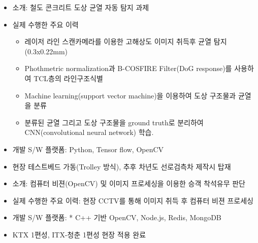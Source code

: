 \documentclass[10pt,a4paper,ragged2e]{altacv}
\begin{document}
\begin{fullwidth}
\begin{itemize}
\item 소개: 철도 콘크리트 도상 균열 자동 탐지 과제
\item 실제 수행한 주요 이력
  \begin{itemize}
    \item 레이저 라인 스캔카메라를 이용한 고해상도 이미지 취득후 균열 탐지 (0.3x0.22mm)
    \item Phothmetric normalization과 B-COSFIRE Filter(DoG response)를 사용하여 TCL층의 라인구조식별
    \item Machine learning(support vector machine)을 이용하여 도상 구조물과 균열을 분류
    \item 분류된 균열 그리고 도상 구조물을 ground truth로 분리하여 CNN(convolutional neural network) 학습.
  \end{itemize}
\item 개발 S/W 플랫폼: Python, Tensor flow, OpenCV
\item 현장 테스트베드 가동(Trolley 방식), 추후 차년도 선로검측차 제작시 탑재
\end{itemize}

\divider


\begin{itemize}
\item 소개: 컴퓨터 비젼(OpenCV) 및 이미지 프로세싱을 이용한 승객 착석유무 판단
\item 실제 수행한 주요 이력: 현장 CCTV를 통해 이미지 취득 후 컴퓨터 비젼 프로세싱
\item 개발 S/W 플랫폼: * C++ 기반 OpenCV, Node.js, Redis, MongoDB
\item KTX 1편성, ITX-청춘 1편성 현장 적용 완료
\end{itemize}


\end{fullwidth}
\end{document}
